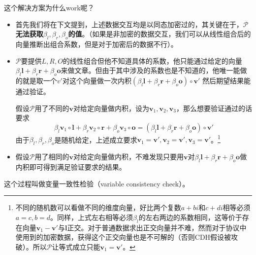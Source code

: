 \documentclass[12pt]{article}
\newcommand{\pp}{$\mathcal{P}$}
\begin{document}
这个解决方案为什么work呢？
\begin{itemize}
	\item 首先我们将在下文提到，上述数据交互均是以同态加密过的，其关键在于，\textbf{\pp 无法获取$\beta_l,\beta_r,\beta_o$的值}。（如果是非加密的数据交互，我们可以从线性组合后的向量推断出组合系数，但是对于加密后的数据不行）。
	\item \pp 要提供$L,R,O$的线性组合但他不知道具体的系数，他只能通过给定的向量$\beta_l\bm{l}+\beta_r\bm{r}+\beta_o\bm{o}$来做文章。但由于其中涉及的系数也是不知道的，他唯一能做的就是取一个$v'$对这个向量做一次内积$(\beta_l\bm{l}+\beta_r\bm{r}+\beta_o\bm{o})\circ \bm{v}'$ 然后期望结果能通过验证。
	
	假设\pp 用了不同的$\bm{v}$对给定向量做内积，设为$\bm{v}_1,\bm{v}_2,\bm{v}_3$，那么想要验证通过的话要求
	$$ \beta_l \bm{v}_1\circ \bm{l}+\beta_r \bm{v}_2\circ \bm{r}+\beta_o \bm{v}_3\circ \bm{o} = (\beta_l\bm{l}+\beta_r\bm{r}+\beta_o\bm{o})\circ \bm{v}'$$
	由于$\beta_l,\beta_r,\beta_o$是随机给定，上述成立要求$ \bm{v}_1=\bm{v}', \bm{v}_2=\bm{v}',\bm{v}_3=\bm{v}'$。\footnote{不同的随机数可以看做不同的维度向量，好比两个复数$a+bi$和$c+di$相等必须$a=c,b=d$。同样，上式左右相等必须$\beta_l$的左右两边的系数相同，这等价于存在向量$\bm{v}_1-\bm{v}'$与$\bm{l}$正交。对于普通数据求出正交向量并不难，然而对于协议中使用到的加密数据，获得这个正交向量也是不可解的（否则CDH假设被攻破）。所以\pp 让等式成立只能$\bm{v}_1=\bm{v}'$。}
	\item  假设\pp 用了相同的$\bm{v}$对给定向量做内积，不难发现只要用$\bm{v}$对$\beta_l\bm{l}+\beta_r\bm{r}+\beta_o\bm{o}$做内积即可得到满足验证要求的结果。
\end{itemize}
这个过程叫做变量一致性检验（variable consistency check）。
\end{document}
